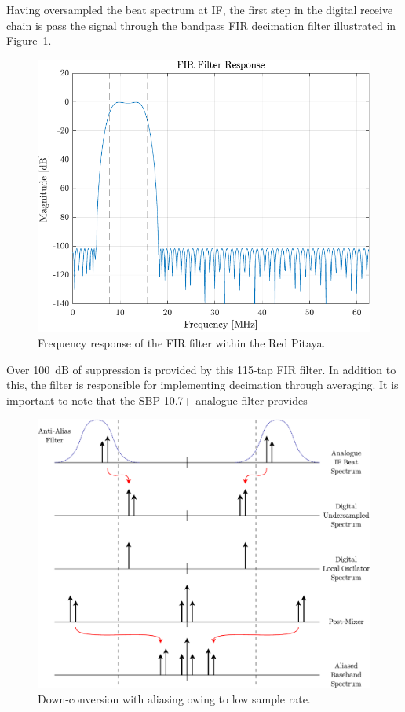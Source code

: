 \documentclass[a4paper,11pt]{report}
\begin{document}
Having oversampled the beat spectrum at IF, the first step in the digital receive chain is pass the signal through the bandpass FIR decimation filter illustrated in Figure~\ref{fig:fir_filter}.  
\begin{figure}[h!]
    \begin{center}
        \includegraphics[width=\textwidth]{images/fir_filter}
        \caption{Frequency response of the FIR filter within the Red Pitaya.}
        \label{fig:fir_filter}
    \end{center}
\end{figure}

Over \SI{100}{\dB} of suppression is provided by this 115-tap FIR filter. In addition to this, the filter is responsible for implementing decimation through averaging. It is important to note that the SBP-10.7+ analogue filter provides 

\begin{figure}[h!]
    \begin{center}
        \includegraphics[width=\textwidth]{images/aliased_down_conversion}
        \caption{Down-conversion with aliasing owing to low sample rate.}
        \label{fig:aliased_down_conversion}
    \end{center}
\end{figure}
\end{document}

